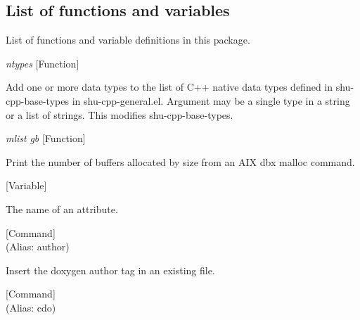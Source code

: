 \subsection{List of functions and variables}

List of functions and variable definitions in this package.



\vspace{1em}
\noindent
{}
\usebox{\funcname}\emph{ntypes}
 \hfill [Function]

\begin{doc-string}
Add one or more data types to the list of C++ native data types defined in shu-cpp-base-types
in shu-cpp-general.el.  Argument may be a single type in a string or a list of strings.
This modifies shu-cpp-base-types.
\end{doc-string}

\vspace{1em}
\noindent
{}
\usebox{\funcname}\emph{mlist} \emph{gb}
 \hfill [Function]

\begin{doc-string}
Print the number of buffers allocated by size from an AIX dbx malloc command.
\end{doc-string}

\vspace{1em}
\noindent
{}
\usebox{\funcname}
 \hfill [Variable]

\begin{doc-string}
The name of an attribute.
\end{doc-string}

\vspace{1em}
\noindent
{}
\usebox{\funcname}
 \hfill [Command]\\%
 (Alias: author)

\begin{doc-string}
Insert the doxygen author tag in an existing file.
\end{doc-string}

\vspace{1em}
\noindent
{}
\usebox{\funcname}
 \hfill [Command]\\%
 (Alias: cdo)

